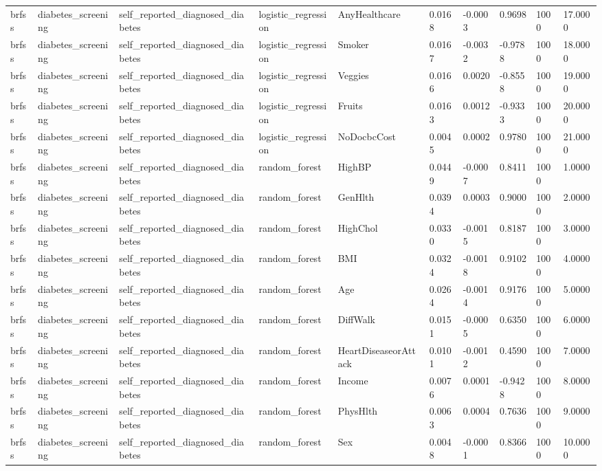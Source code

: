 \begin{tabular}{llllllllll}
brfss & diabetes\_screening & self\_reported\_diagnosed\_diabetes & logistic\_regression & AnyHealthcare & 0.0168 & -0.0003 & 0.9698 & 1000 & 17.0000 \\
brfss & diabetes\_screening & self\_reported\_diagnosed\_diabetes & logistic\_regression & Smoker & 0.0167 & -0.0032 & -0.9788 & 1000 & 18.0000 \\
brfss & diabetes\_screening & self\_reported\_diagnosed\_diabetes & logistic\_regression & Veggies & 0.0166 & 0.0020 & -0.8558 & 1000 & 19.0000 \\
brfss & diabetes\_screening & self\_reported\_diagnosed\_diabetes & logistic\_regression & Fruits & 0.0163 & 0.0012 & -0.9333 & 1000 & 20.0000 \\
brfss & diabetes\_screening & self\_reported\_diagnosed\_diabetes & logistic\_regression & NoDocbcCost & 0.0045 & 0.0002 & 0.9780 & 1000 & 21.0000 \\
brfss & diabetes\_screening & self\_reported\_diagnosed\_diabetes & random\_forest & HighBP & 0.0449 & -0.0007 & 0.8411 & 1000 & 1.0000 \\
brfss & diabetes\_screening & self\_reported\_diagnosed\_diabetes & random\_forest & GenHlth & 0.0394 & 0.0003 & 0.9000 & 1000 & 2.0000 \\
brfss & diabetes\_screening & self\_reported\_diagnosed\_diabetes & random\_forest & HighChol & 0.0330 & -0.0015 & 0.8187 & 1000 & 3.0000 \\
brfss & diabetes\_screening & self\_reported\_diagnosed\_diabetes & random\_forest & BMI & 0.0324 & -0.0018 & 0.9102 & 1000 & 4.0000 \\
brfss & diabetes\_screening & self\_reported\_diagnosed\_diabetes & random\_forest & Age & 0.0264 & -0.0014 & 0.9176 & 1000 & 5.0000 \\
brfss & diabetes\_screening & self\_reported\_diagnosed\_diabetes & random\_forest & DiffWalk & 0.0151 & -0.0005 & 0.6350 & 1000 & 6.0000 \\
brfss & diabetes\_screening & self\_reported\_diagnosed\_diabetes & random\_forest & HeartDiseaseorAttack & 0.0101 & -0.0012 & 0.4590 & 1000 & 7.0000 \\
brfss & diabetes\_screening & self\_reported\_diagnosed\_diabetes & random\_forest & Income & 0.0076 & 0.0001 & -0.9428 & 1000 & 8.0000 \\
brfss & diabetes\_screening & self\_reported\_diagnosed\_diabetes & random\_forest & PhysHlth & 0.0063 & 0.0004 & 0.7636 & 1000 & 9.0000 \\
brfss & diabetes\_screening & self\_reported\_diagnosed\_diabetes & random\_forest & Sex & 0.0048 & -0.0001 & 0.8366 & 1000 & 10.0000 \\

\end{tabular}
